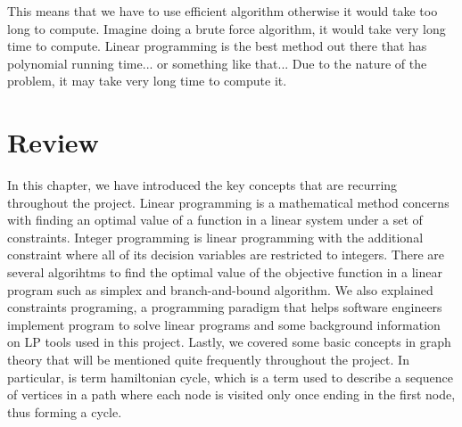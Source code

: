 This means that we have to use efficient algorithm otherwise it would take too long to compute. Imagine doing a brute force algorithm, it
would take very long time to compute. Linear programming is the best method out there that has polynomial running time... or something like
that... Due to the nature of the problem, it may take very long time to compute it.

\section{Review}
In this chapter, we have introduced the key concepts that are recurring throughout the project. Linear programming is a
mathematical method concerns with finding an optimal value of a function in a linear system under a set of constraints. Integer
programming is linear programming with the additional constraint where all of its decision variables are restricted to integers.
There are several algorihtms to find the optimal value of the objective function in a linear program such as simplex and branch-and-bound
algorithm. We also explained constraints programing, a programming paradigm that helps software engineers implement program
to solve linear programs and some background information on LP tools used in this project. Lastly, we covered some basic
concepts in graph theory that will be mentioned quite frequently throughout the project. In particular, is term hamiltonian cycle, which is
a term used to describe a sequence of vertices in a path where each node is visited only once ending in the first node, thus forming a cycle.
